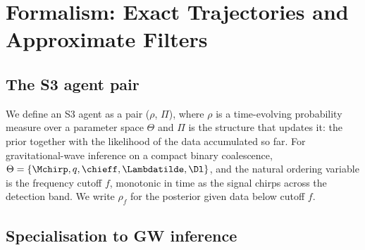 %
%
%

\section{Formalism: Exact Trajectories and Approximate Filters}
\label{sec:formalism}

\subsection{The S3 agent pair}

We define an S3 agent as a pair ($\rho$, $\Pi$), where $\rho$ is a
time-evolving probability measure over a parameter space $\Theta$ and
$\Pi$ is the structure that updates it: the prior together with the
likelihood of the data accumulated so far. For gravitational-wave
inference on a compact binary coalescence,
$\Theta = \{\Mchirp, q, \chieff, \Lambdatilde, \Dl\}$, and the natural
ordering variable is the frequency cutoff $f$, monotonic in time as the
signal chirps across the detection band. We write $\rho_f$ for the
posterior given data below cutoff $f$.

\subsection{Specialisation to GW inference}

